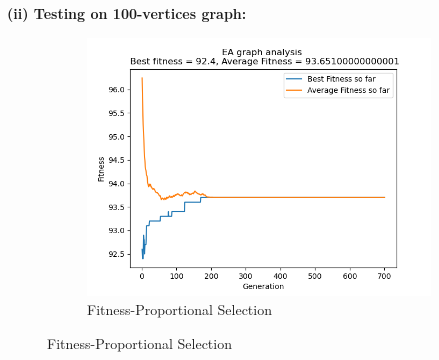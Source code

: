\documentclass[conference,compsoc]{IEEEtran}
\begin{document}
\newpage
\begin{center}
  \textbf{(ii) Testing on 100-vertices graph:}
\end{center}
\begin{figure}[h!]
  \centering 
  \begin{subfigure}{0.34\textwidth}
    \includegraphics[width=\linewidth]{../Results/_100_FPS_Truncation_100_50_700.png}
    \caption{Fitness-Proportional Selection}
  \end{subfigure}
\end{figure}
\end{document}
